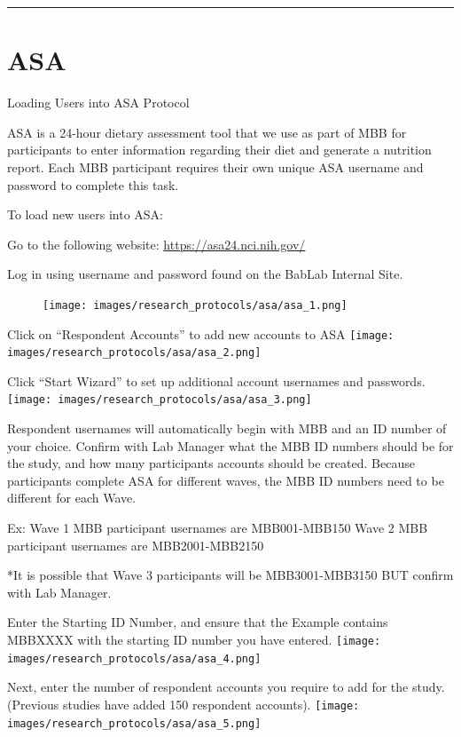 \documentclass[
]{book}
\begin{document}
\begin{center}\rule{0.5\linewidth}{0.5pt}\end{center}

\hypertarget{asa}{%
\section{ASA}\label{asa}}

Loading Users into ASA Protocol

ASA is a 24-hour dietary assessment tool that we use as part of MBB for participants to enter information regarding their diet and generate a nutrition report. Each MBB participant requires their own unique ASA username and password to complete this task.

To load new users into ASA:

Go to the following website: \url{https://asa24.nci.nih.gov/}

Log in using username and password found on the BabLab Internal Site.

\begin{figure}
\centering
\texttt{[image: images/research\_protocols/asa/asa\_1.png]}
\caption{}
\end{figure}

Click on ``Respondent Accounts'' to add new accounts to ASA
\texttt{[image: images/research\_protocols/asa/asa\_2.png]}

Click ``Start Wizard'' to set up additional account usernames and passwords.
\texttt{[image: images/research\_protocols/asa/asa\_3.png]}

Respondent usernames will automatically begin with MBB and an ID number of your choice. Confirm with Lab Manager what the MBB ID numbers should be for the study, and how many participants accounts should be created. Because participants complete ASA for different waves, the MBB ID numbers need to be different for each Wave.

Ex: Wave 1 MBB participant usernames are MBB001-MBB150
Wave 2 MBB participant usernames are MBB2001-MBB2150

*It is possible that Wave 3 participants will be MBB3001-MBB3150 BUT confirm with Lab Manager.

Enter the Starting ID Number, and ensure that the Example contains MBBXXXX with the starting ID number you have entered.
\texttt{[image: images/research\_protocols/asa/asa\_4.png]}

Next, enter the number of respondent accounts you require to add for the study. (Previous studies have added 150 respondent accounts).
\texttt{[image: images/research\_protocols/asa/asa\_5.png]}
\end{document}
